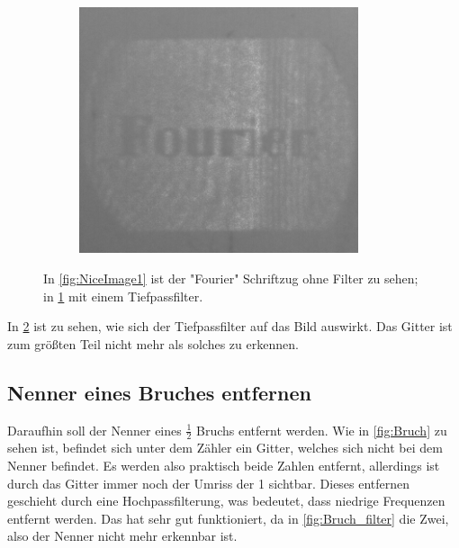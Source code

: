 \begin{figure}[h]
\begin{subfigure}[c]{0.5\textwidth}
\end{subfigure}
\begin{subfigure}[c]{0.5\textwidth}
	\includegraphics[width=0.9\textwidth]{Fourier_Filter.png}
	      \caption{}
          \label{fig:NiceImage2}
\end{subfigure}
\caption{In \cref{fig:NiceImage1} ist der "Fourier" Schriftzug ohne Filter zu sehen; in \cref{fig:NiceImage2} mit einem Tiefpassfilter.}
\label{Fourier}
\end{figure}   

In \cref{Fourier} ist zu sehen, wie sich der Tiefpassfilter auf das Bild auswirkt. Das Gitter ist zum größten Teil nicht mehr als solches zu erkennen.

\subsection{Nenner eines Bruches entfernen}
Daraufhin soll der Nenner eines $\frac{1}{2}$ Bruchs entfernt werden. Wie in \cref{fig:Bruch} zu sehen ist, befindet sich unter dem Zähler ein Gitter, welches sich nicht bei dem Nenner befindet. Es werden also praktisch beide Zahlen entfernt, allerdings ist durch das Gitter immer noch der Umriss der 1 sichtbar. Dieses entfernen geschieht durch eine Hochpassfilterung, was bedeutet, dass niedrige Frequenzen entfernt werden. Das hat sehr gut funktioniert, da in \cref{fig:Bruch_filter} die Zwei, also der Nenner nicht mehr erkennbar ist.


